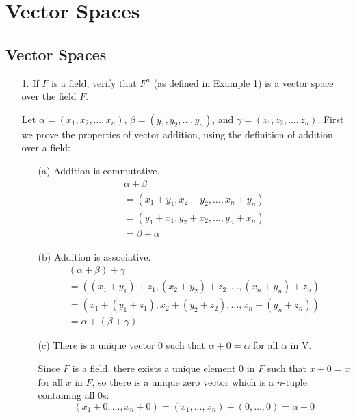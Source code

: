 \documentclass{article}
\begin{document}
\setcounter{section}{1}
\section{Vector Spaces}

\subsection{Vector Spaces}
\begin{enumerate}[listparindent=\parindent]
\item[1.] If \(F\) is a field, verify that \(F^n\) (as defined in Example 1) is a vector space over the field \(F\).

Let \(\alpha = (x_1, x_2, \dots, x_n)\), \(\beta = (y_1, y_2, \dots, y_n)\), and \(\gamma = (z_1, z_2, \dots, z_n)\).
First we prove the properties of vector addition, using the definition of addition over a field:
    \begin{enumerate}[listparindent=\parindent]
        \item[(a)] Addition is commutative.
        \begin{gather*}
            \alpha + \beta \\
            = (x_1 + y_1, x_2 + y_2, \dots, x_n + y_n) \\
            = (y_1 + x_1, y_2 + x_2, \dots, y_n + x_n) \\
            = \beta + \alpha
        \end{gather*}

        \item[(b)] Addition is associative.
        \begin{gather*}
            (\alpha + \beta) + \gamma \\
            = ((x_1 + y_1) + z_1, (x_2 + y_2) + z_2, \dots, (x_n + y_n) + z_n) \\
            = (x_1 + (y_1 + z_1), x_2 + (y_2 + z_2), \dots, x_n + (y_n + z_n)) \\
            = \alpha + (\beta + \gamma)
        \end{gather*}

        \item[(c)] There is a unique vector 0 such that \(\alpha + 0 = \alpha\) for all \(\alpha\) in V.

            Since \(F\) is a field, there exists a unique element 0 in \(F\) such that \(x + 0 = x\) for all \(x\) in \(F\),
            so there is a unique zero vector which is a \(n\)-tuple containing all 0s:
            \[(x_1 + 0, \dots, x_n + 0) = (x_1, \dots, x_n) + (0, \dots, 0) = \alpha + 0\]


\end{enumerate}
\end{enumerate}
\end{document}
